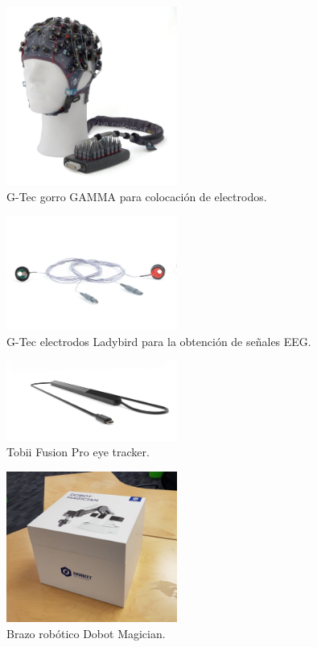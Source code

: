 \documentclass[12pt]{article}
\begin{document}
\begin{figure}[H]
    \centering
    \includegraphics[width=0.5\textwidth]{recursos_img/g_tec_EEG_cap.jpg}
    \caption{G-Tec gorro GAMMA para colocación de electrodos.}
    \label{fig:eeg_cap}
\end{figure}

\begin{figure}[H]
    \centering
    \includegraphics[width=0.5\textwidth]{recursos_img/g_tec_ladybird.jpg}
    \caption{G-Tec electrodos Ladybird para la obtención de señales EEG.}
    \label{fig:ladybird}
\end{figure}

\begin{figure}[H]
    \centering
    \includegraphics[width=0.5\textwidth]{recursos_img/tobii_fusion_pro.jpg}
    \caption{Tobii Fusion Pro eye tracker.}
    \label{fig:tobii}
\end{figure}

\begin{figure}[H]
    \centering
    \includegraphics[width=0.5\textwidth]{recursos_img/dobot_magician.jpg}
    \caption{Brazo robótico Dobot Magician.}
    \label{fig:dobot}
\end{figure}
\end{document}
